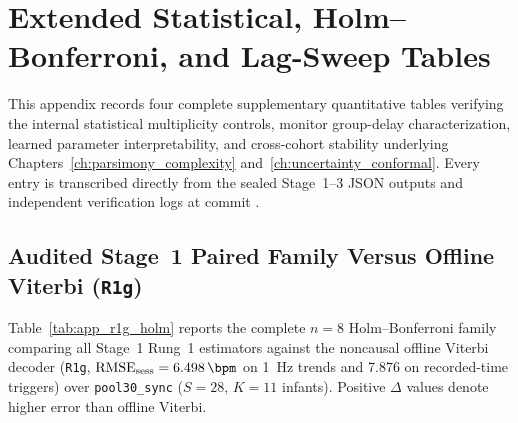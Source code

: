 \chapter{Extended Statistical, Holm--Bonferroni, and Lag-Sweep Tables}
\label{app:tables}

This appendix records four complete supplementary quantitative tables verifying the internal
statistical multiplicity controls, monitor group-delay characterization, learned parameter
interpretability, and cross-cohort stability underlying Chapters~\ref{ch:parsimony_complexity}
and~\ref{ch:uncertainty_conformal}. Every entry is transcribed directly from the sealed Stage~1--3
JSON outputs and independent verification logs at commit \FrozenGitCommit{}.

\section{Audited Stage~1 Paired Family Versus Offline Viterbi (\texttt{R1g})}
\label{app:sec_r1g_holm}

Table~\ref{tab:app_r1g_holm} reports the complete $n=8$ Holm--Bonferroni family comparing all Stage~1
Rung~1 estimators against the noncausal offline Viterbi decoder (\texttt{R1g}, $\rmseSess =
\SI{6.498}{\bpm}$ on \SI{1}{\hertz} trends and \SI{7.876}{\bpm} on recorded-time triggers) over
\texttt{pool30\_sync} ($S=28$, $K=11$ infants). Positive $\Delta$ values denote higher error than
offline Viterbi.

